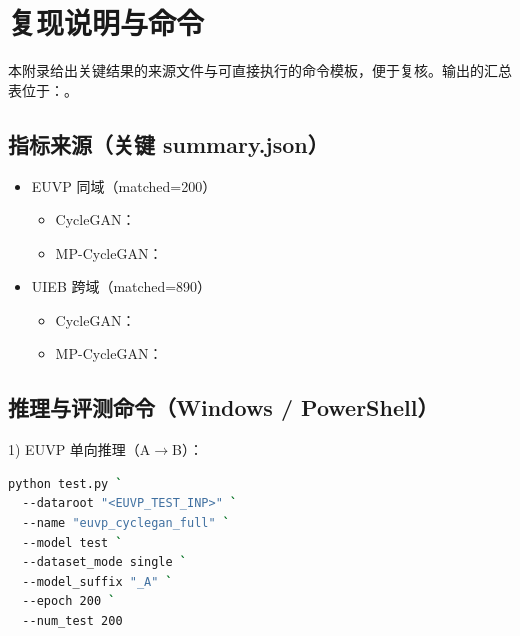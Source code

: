 \documentclass[a4paper,zihao=-4,linespread=1.25]{ctexart}
\begin{document}
\newpage
\appendix
\section{复现说明与命令}
本附录给出关键结果的来源文件与可直接执行的命令模板，便于复核。输出的汇总表位于：。

\subsection{指标来源（关键 summary.json）}
\begin{itemize}
    \item EUVP 同域（matched=200）
    \begin{itemize}
        \item CycleGAN：\newline{}
        \item MP-CycleGAN：\newline{}
    \end{itemize}
    \item UIEB 跨域（matched=890）
    \begin{itemize}
        \item CycleGAN：\newline{}
        \item MP-CycleGAN：\newline{}
    \end{itemize}
\end{itemize}

\subsection{推理与评测命令（Windows / PowerShell）}
1) EUVP 单向推理（A$\to$B）：
\begin{lstlisting}[language=bash]
python test.py `
  --dataroot "<EUVP_TEST_INP>" `
  --name "euvp_cyclegan_full" `
  --model test `
  --dataset_mode single `
  --model_suffix "_A" `
  --epoch 200 `
  --num_test 200
\end{lstlisting}
\end{document}
